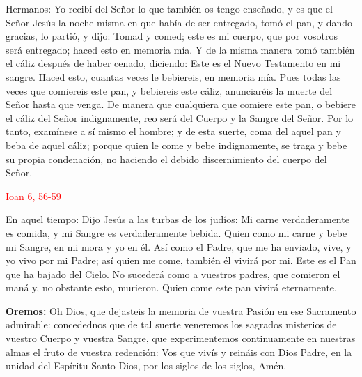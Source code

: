 \documentclass[10pt]{article}
\begin{document}
\begin{multicols}{2}
      Hermanos: Yo recibí del Señor lo que también os tengo enseñado, y es que el Señor Jesús la noche misma en que había de ser entregado, tomó el pan, y dando gracias, lo partió, y dijo:
      Tomad y comed; este es mi cuerpo, que por vosotros será entregado; haced esto en memoria mía. Y de la misma manera tomó también el cáliz después de haber cenado, diciendo: Este es el
      Nuevo Testamento en mi sangre. Haced esto, cuantas veces le bebiereis, en memoria mía. Pues todas las veces que comiereis este pan, y bebiereis este cáliz, anunciaréis la muerte del
      Señor hasta que venga. De manera que cualquiera que comiere este pan, o bebiere el cáliz del Señor indignamente, reo será del Cuerpo y la Sangre del Señor. Por lo tanto, examínese a
      sí mismo el hombre; y de esta suerte, coma del aquel pan y beba de aquel cáliz; porque quien le come y bebe indignamente, se traga y bebe su propia condenación, no haciendo el debido
      discernimiento del cuerpo del Señor.\newline

      \hfill\textcolor{red}{Ioan 6, 56-59}

      En aquel tiempo: Dijo Jesús a las turbas de los judíos: Mi carne verdaderamente es comida, y mi Sangre es verdaderamente bebida. Quien como mi carne y bebe mi Sangre, en mi mora y yo en él.
      Así como el Padre, que me ha enviado, vive, y yo vivo por mi Padre; así quien me come, también él vivirá por mi. Este es el Pan que ha bajado del Cielo. No sucederá como a vuestros padres,
      que comieron el maná y, no obstante esto, murieron. Quien come este pan vivirá eternamente.\newline

      \begin{otherlanguage}{latin}
            

            

            
      \end{otherlanguage}
      \newline

      \textbf{Oremos:} Oh Dios, que dejasteis la memoria de vuestra Pasión en ese Sacramento admirable: concedednos que de tal suerte veneremos los sagrados misterios de vuestro Cuerpo 
      y vuestra Sangre, que experimentemos continuamente en nuestras almas el fruto de vuestra redención: Vos que vivís y reináis con Dios Padre, en la unidad del Espíritu Santo Dios, 
      por los siglos de los siglos, Amén.


\end{multicols}
\end{document}
